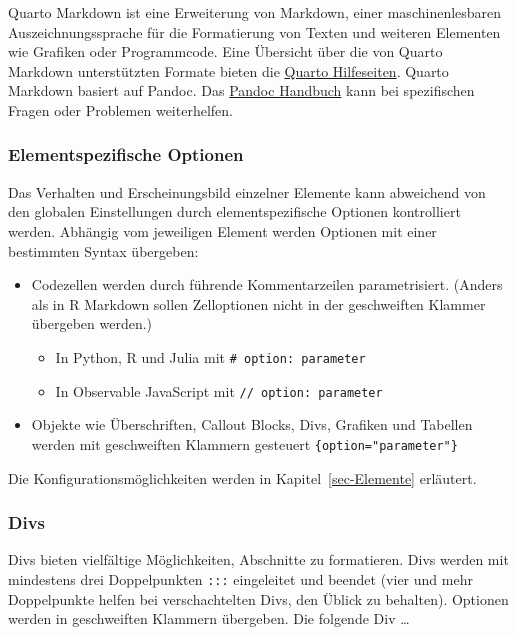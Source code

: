 \documentclass[
  letterpaper,
  DIV=11]{scrartcl}
\begin{document}
Quarto Markdown ist eine Erweiterung von Markdown, einer
maschinenlesbaren Auszeichnungssprache für die Formatierung von Texten
und weiteren Elementen wie Grafiken oder Programmcode. Eine Übersicht
über die von Quarto Markdown unterstützten Formate bieten die
\href{https://quarto.org/docs/guide/}{Quarto Hilfeseiten}. Quarto
Markdown basiert auf Pandoc. Das
\href{https://pandoc.org/MANUAL.html\#pandocs-markdown}{Pandoc Handbuch}
kann bei spezifischen Fragen oder Problemen weiterhelfen.

\subsubsection{Elementspezifische
Optionen}\label{elementspezifische-optionen}

Das Verhalten und Erscheinungsbild einzelner Elemente kann abweichend
von den globalen Einstellungen durch elementspezifische Optionen
kontrolliert werden. Abhängig vom jeweiligen Element werden Optionen mit
einer bestimmten Syntax übergeben:

\begin{itemize}
\item
  Codezellen werden durch führende Kommentarzeilen parametrisiert.
  (Anders als in R Markdown sollen Zelloptionen nicht in der
  geschweiften Klammer übergeben werden.)

  \begin{itemize}
  \item
    In Python, R und Julia mit \texttt{\#\textbar{}\ option:\ parameter}
  \item
    In Observable JavaScript mit
    \texttt{//\textbar{}\ option:\ parameter}
  \end{itemize}
\item
  Objekte wie Überschriften, Callout Blocks, Divs, Grafiken und Tabellen
  werden mit geschweiften Klammern gesteuert
  \texttt{\{option="parameter"\}}
\end{itemize}

Die Konfigurationsmöglichkeiten werden in Kapitel~\ref{sec-Elemente}
erläutert.

\subsubsection{Divs}\label{divs}

Divs bieten vielfältige Möglichkeiten, Abschnitte zu formatieren. Divs
werden mit mindestens drei Doppelpunkten \texttt{:::} eingeleitet und
beendet (vier und mehr Doppelpunkte helfen bei verschachtelten Divs, den
Üblick zu behalten). Optionen werden in geschweiften Klammern übergeben.
Die folgende Div \ldots{}
\end{document}
